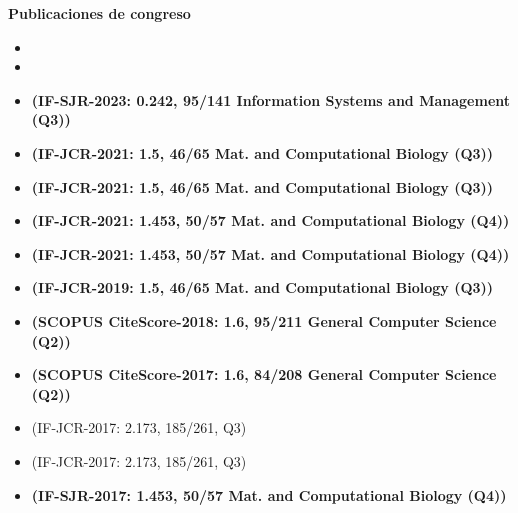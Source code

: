 \textbf{Publicaciones de congreso}
\begin{itemize}
 \item {}
 \item {} 
 \item {} \textbf{(IF-SJR-2023: 0.242, 95/141 Information Systems and Management (Q3))} %
 \item {} \textbf{(IF-JCR-2021: 1.5, 46/65 Mat. and Computational Biology (Q3))} %
 \item {} \textbf{(IF-JCR-2021: 1.5, 46/65 Mat. and Computational Biology (Q3))} %
 \item {} \textbf{(IF-JCR-2021: 1.453, 50/57 Mat. and Computational Biology (Q4))}
 \item {} \textbf{(IF-JCR-2021: 1.453, 50/57 Mat. and Computational Biology (Q4))}
 \item {} \textbf{(IF-JCR-2019: 1.5, 46/65 Mat. and Computational Biology (Q3))}
 \item {} \textbf{(SCOPUS CiteScore-2018: 1.6, 95/211 General Computer Science (Q2))}
 \item {} \textbf{(SCOPUS CiteScore-2017: 1.6, 84/208 General Computer Science (Q2))}
 \item {} (IF-JCR-2017: 2.173, 185/261, Q3)
 \item {} (IF-JCR-2017: 2.173, 185/261, Q3)
 \item {} \textbf{(IF-SJR-2017: 1.453, 50/57 Mat. and Computational Biology (Q4))}
\end{itemize}


